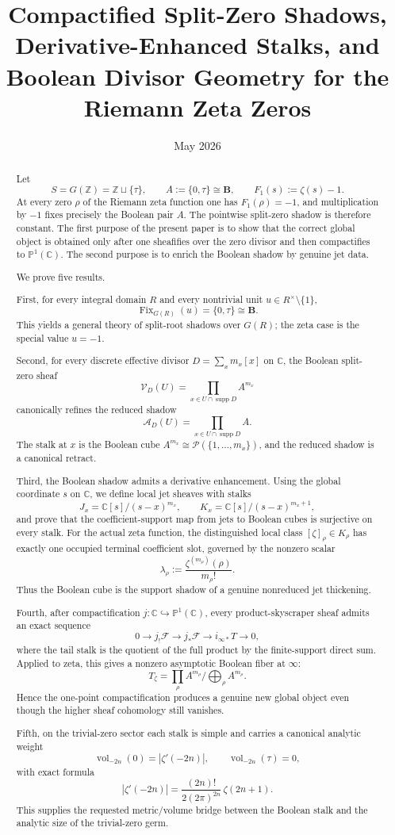 \documentclass[11pt,a4paper]{article}
\title{Compactified Split-Zero Shadows, Derivative-Enhanced Stalks, and Boolean Divisor Geometry for the Riemann Zeta Zeros}
\author{}
\date{May 2026}
\theoremstyle{definition}
\theoremstyle{remark}
\DeclareMathOperator{\Fix}{Fix}
\DeclareMathOperator{\supp}{supp}
\DeclareMathOperator{\vol}{vol}
\newcommand{\ZZ}{\mathbb Z}
\newcommand{\CC}{\mathbb C}
\newcommand{\PP}{\mathbb P}
\newcommand{\BB}{\mathbf B}
\newcommand{\cP}{\mathcal P}
\newcommand{\taup}{\tau}
\newcommand{\into}{\hookrightarrow}
\begin{document}
\maketitle

\begin{abstract}
Let
\[
S=G(\ZZ)=\ZZ\sqcup\{\taup\},\qquad A:=\{0,\taup\}\cong\BB,
\qquad F_1(s):=\zeta(s)-1.
\]
At every zero $\rho$ of the Riemann zeta function one has $F_1(\rho)=-1$, and multiplication by $-1$ fixes precisely the Boolean pair $A$.  The pointwise split-zero shadow is therefore constant.  The first purpose of the present paper is to show that the correct global object is obtained only after one sheafifies over the zero divisor and then compactifies to $\PP^1(\CC)$.  The second purpose is to enrich the Boolean shadow by genuine jet data.

We prove five results.

First, for every integral domain $R$ and every nontrivial unit $u\in R^\times\setminus\{1\}$,
\[
\Fix_{G(R)}(u)=\{0,\taup\}\cong\BB.
\]
This yields a general theory of split-root shadows over $G(R)$; the zeta case is the special value $u=-1$.

Second, for every discrete effective divisor $D=\sum_x m_x[x]$ on $\CC$, the Boolean split-zero sheaf
\[
\mathcal V_D(U)=\prod_{x\in U\cap \supp D}A^{m_x}
\]
canonically refines the reduced shadow
\[
\mathcal A_D(U)=\prod_{x\in U\cap \supp D}A.
\]
The stalk at $x$ is the Boolean cube $A^{m_x}\cong\cP(\{1,\dots,m_x\})$, and the reduced shadow is a canonical retract.

Third, the Boolean shadow admits a derivative enhancement.  Using the global coordinate $s$ on $\CC$, we define local jet sheaves with stalks
\[
J_x=\CC[s]/(s-x)^{m_x},
\qquad
K_x=\CC[s]/(s-x)^{m_x+1},
\]
and prove that the coefficient-support map from jets to Boolean cubes is surjective on every stalk.  For the actual zeta function, the distinguished local class $[\zeta]_\rho\in K_\rho$ has exactly one occupied terminal coefficient slot, governed by the nonzero scalar
\[
\lambda_\rho:=\frac{\zeta^{(m_\rho)}(\rho)}{m_\rho!}.
\]
Thus the Boolean cube is the support shadow of a genuine nonreduced jet thickening.

Fourth, after compactification $j:\CC\into\PP^1(\CC)$, every product-skyscraper sheaf admits an exact sequence
\[
0\to j_!\mathcal F\to j_*\mathcal F\to i_{\infty *}T\to0,
\]
where the tail stalk is the quotient of the full product by the finite-support direct sum.  Applied to zeta, this gives a nonzero asymptotic Boolean fiber at $\infty$:
\[
T_\zeta=\prod_{\rho}A^{m_\rho}\Big/\bigoplus_{\rho}A^{m_\rho}.
\]
Hence the one-point compactification produces a genuine new global object even though the higher sheaf cohomology still vanishes.

Fifth, on the trivial-zero sector each stalk is simple and carries a canonical analytic weight
\[
\vol_{-2n}(0)=|\zeta'(-2n)|,
\qquad
\vol_{-2n}(\taup)=0,
\]
with exact formula
\[
|\zeta'(-2n)|=\frac{(2n)!}{2(2\pi)^{2n}}\,\zeta(2n+1).
\]
This supplies the requested metric/volume bridge between the Boolean stalk and the analytic size of the trivial-zero germ.
\end{abstract}
\end{document}
